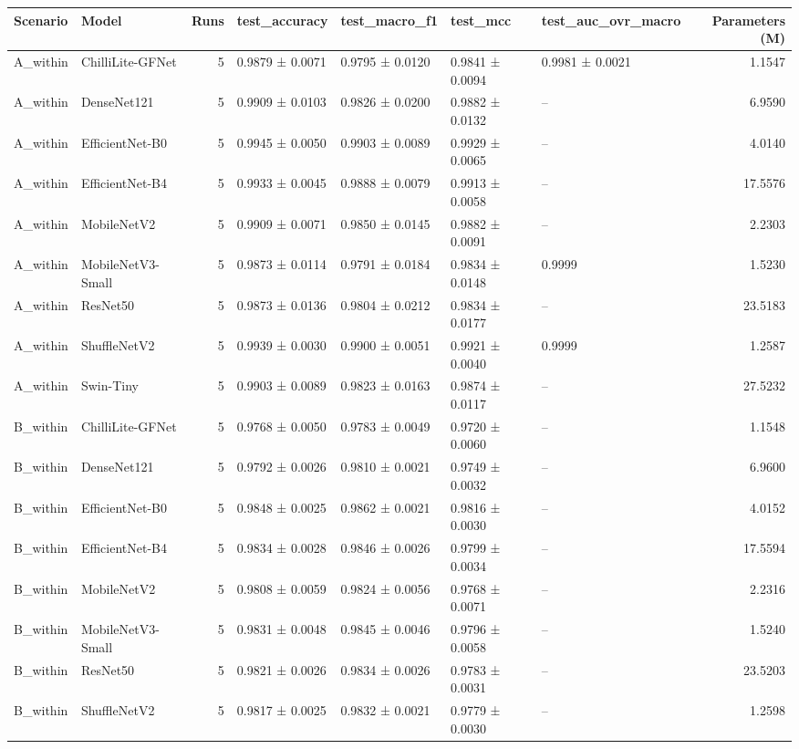 \begin{tabular}{llrllllr}
\toprule
Scenario & Model & Runs & test\_accuracy & test\_macro\_f1 & test\_mcc & test\_auc\_ovr\_macro & Parameters (M) \\
\midrule
A\_within & ChilliLite-GFNet & 5 & 0.9879 ± 0.0071 & 0.9795 ± 0.0120 & 0.9841 ± 0.0094 & 0.9981 ± 0.0021 & 1.1547 \\
A\_within & DenseNet121 & 5 & 0.9909 ± 0.0103 & 0.9826 ± 0.0200 & 0.9882 ± 0.0132 & -- & 6.9590 \\
A\_within & EfficientNet-B0 & 5 & 0.9945 ± 0.0050 & 0.9903 ± 0.0089 & 0.9929 ± 0.0065 & -- & 4.0140 \\
A\_within & EfficientNet-B4 & 5 & 0.9933 ± 0.0045 & 0.9888 ± 0.0079 & 0.9913 ± 0.0058 & -- & 17.5576 \\
A\_within & MobileNetV2 & 5 & 0.9909 ± 0.0071 & 0.9850 ± 0.0145 & 0.9882 ± 0.0091 & -- & 2.2303 \\
A\_within & MobileNetV3-Small & 5 & 0.9873 ± 0.0114 & 0.9791 ± 0.0184 & 0.9834 ± 0.0148 & 0.9999 & 1.5230 \\
A\_within & ResNet50 & 5 & 0.9873 ± 0.0136 & 0.9804 ± 0.0212 & 0.9834 ± 0.0177 & -- & 23.5183 \\
A\_within & ShuffleNetV2 & 5 & 0.9939 ± 0.0030 & 0.9900 ± 0.0051 & 0.9921 ± 0.0040 & 0.9999 & 1.2587 \\
A\_within & Swin-Tiny & 5 & 0.9903 ± 0.0089 & 0.9823 ± 0.0163 & 0.9874 ± 0.0117 & -- & 27.5232 \\
B\_within & ChilliLite-GFNet & 5 & 0.9768 ± 0.0050 & 0.9783 ± 0.0049 & 0.9720 ± 0.0060 & -- & 1.1548 \\
B\_within & DenseNet121 & 5 & 0.9792 ± 0.0026 & 0.9810 ± 0.0021 & 0.9749 ± 0.0032 & -- & 6.9600 \\
B\_within & EfficientNet-B0 & 5 & 0.9848 ± 0.0025 & 0.9862 ± 0.0021 & 0.9816 ± 0.0030 & -- & 4.0152 \\
B\_within & EfficientNet-B4 & 5 & 0.9834 ± 0.0028 & 0.9846 ± 0.0026 & 0.9799 ± 0.0034 & -- & 17.5594 \\
B\_within & MobileNetV2 & 5 & 0.9808 ± 0.0059 & 0.9824 ± 0.0056 & 0.9768 ± 0.0071 & -- & 2.2316 \\
B\_within & MobileNetV3-Small & 5 & 0.9831 ± 0.0048 & 0.9845 ± 0.0046 & 0.9796 ± 0.0058 & -- & 1.5240 \\
B\_within & ResNet50 & 5 & 0.9821 ± 0.0026 & 0.9834 ± 0.0026 & 0.9783 ± 0.0031 & -- & 23.5203 \\
B\_within & ShuffleNetV2 & 5 & 0.9817 ± 0.0025 & 0.9832 ± 0.0021 & 0.9779 ± 0.0030 & -- & 1.2598 \\

\end{tabular}
